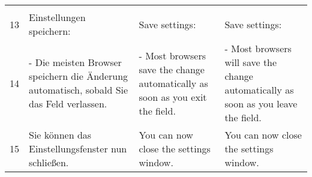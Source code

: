 {\begin{tabularx}{\textwidth}{l>{\raggedright\arraybackslash}X>{\raggedright\arraybackslash}X>{\raggedright\arraybackslash}X}
   &                                                                                                                                                   &                                                                                                                                            &                                                                                                                                                \\
13 & Einstellungen speichern:                                                                                                                          & Save settings:                                                                                                                             & Save settings:                                                                                                                                 \\
14 & - Die meisten Browser speichern die Änderung automatisch, sobald Sie das Feld verlassen.                                                          & - Most browsers save the change automatically as soon as you exit the field.                                                               & - Most browsers will save the change automatically as soon as you leave the field.                                                             \\
15 & Sie können das Einstellungsfenster nun schließen.                                                                                                 & You can now close the settings window.                                                                                                     & You can now close the settings window.                                                                                                        
\\ 
\bottomrule
\end{tabularx}}